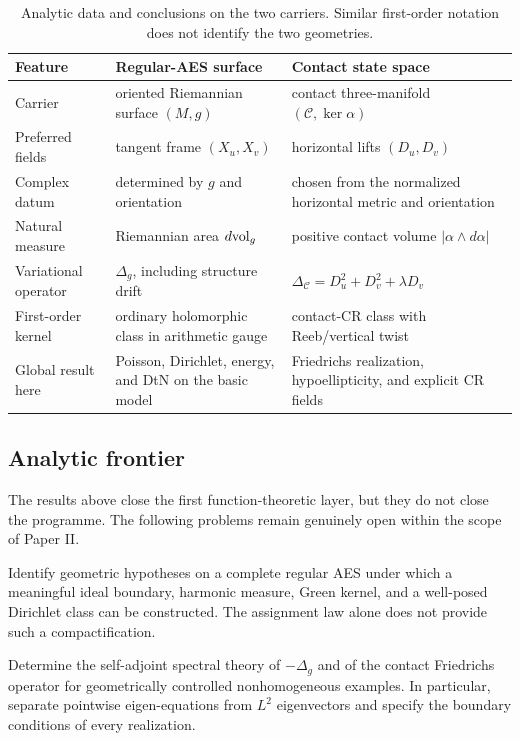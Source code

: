\begin{table}[t]
\centering
\small
\begin{tabular}{@{}p{}p{}p{}@{}}
\toprule
Feature & Regular-AES surface & Contact state space \\
\midrule
Carrier & oriented Riemannian surface $(M,g)$ & contact three-manifold
$(\mathcal C,\ker\alpha)$ \\
Preferred fields & tangent frame $(X_u,X_v)$ & horizontal lifts
$(D_u,D_v)$ \\
Complex datum & determined by $g$ and orientation & chosen from the normalized
horizontal metric and orientation \\
Natural measure & Riemannian area $d\mathrm{vol}_g$ & positive contact volume
$|\alpha\wedge d\alpha|$ \\
Variational operator & $\Delta_g$, including structure drift &
$\Delta_{\mathcal C}=D_u^2+D_v^2+\lambda D_v$ \\
First-order kernel & ordinary holomorphic class in arithmetic gauge & contact-CR
class with Reeb/vertical twist \\
Global result here & Poisson, Dirichlet, energy, and DtN on the basic model &
Friedrichs realization, hypoellipticity, and explicit CR fields \\
\bottomrule
\end{tabular}
\caption{Analytic data and conclusions on the two carriers.  Similar first-order
notation does not identify the two geometries.}
\label{tab:final-branch-comparison}
\end{table}

\subsection{Analytic frontier}

The results above close the first function-theoretic layer, but they do not close the
programme.  The following problems remain genuinely open within the scope of Paper
II.

\begin{problem}
Identify geometric hypotheses on a complete regular AES under which a meaningful
ideal boundary, harmonic measure, Green kernel, and a well-posed Dirichlet class can
be constructed.  The assignment law alone does not provide such a compactification.
\end{problem}

\begin{problem}
Determine the self-adjoint spectral theory of $-\Delta_g$ and of the contact
Friedrichs operator for geometrically controlled nonhomogeneous examples.  In
particular, separate pointwise eigen-equations from $L^2$ eigenvectors and specify
the boundary conditions of every realization.
\end{problem}

